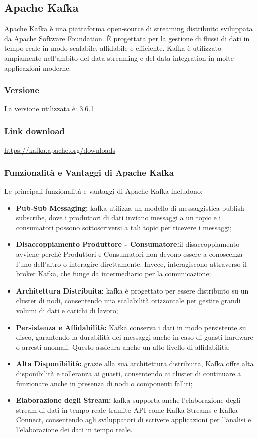 \subsection{Apache Kafka}

Apache Kafka è una piattaforma open-source di streaming distribuito sviluppata da Apache Software Foundation. È progettata per la gestione di flussi di dati in tempo reale in modo scalabile, affidabile e efficiente. Kafka è utilizzato ampiamente nell'ambito del data streaming e del data integration in molte applicazioni moderne.
\subsubsection{Versione}
La versione utilizzata è: 3.6.1
\subsubsection{Link download}
\href{https://kafka.apache.org/downloads}{https://kafka.apache.org/downloads}

\subsubsection{Funzionalità e Vantaggi di Apache Kafka}
Le principali funzionalità e vantaggi di Apache Kafka includono:

\begin{itemize}
  \item \textbf{Pub-Sub Messaging:} kafka utilizza un modello di messaggistica publish-subscribe, dove i produttori di dati inviano messaggi a un topic e i consumatori possono sottoscriversi a tali topic per ricevere i messaggi;
  \item \textbf{Disaccoppiamento Produttore - Consumatore:}il disaccoppiamento avviene perché Produttori e Consumatori non devono essere a conoscenza l'uno dell'altro o interagire direttamente. Invece, interagiscono attraverso il broker Kafka, che funge da intermediario per la comunicazione;
  \item \textbf{Architettura Distribuita:} kafka è progettato per essere distribuito su un cluster di nodi, consentendo una scalabilità orizzontale per gestire grandi volumi di dati e carichi di lavoro;
  
  \item \textbf{Persistenza e Affidabilità:} Kafka conserva i dati in modo persistente su disco, garantendo la durabilità dei messaggi anche in caso di guasti hardware o arresti anomali. Questo assicura anche un alto livello di affidabilità;
  
  \item \textbf{Alta Disponibilità:} grazie alla sua architettura distribuita, Kafka offre alta disponibilità e tolleranza ai guasti, consentendo ai cluster di continuare a funzionare anche in presenza di nodi o componenti falliti;
  
  \item \textbf{Elaborazione degli Stream:} kafka supporta anche l'elaborazione degli stream di dati in tempo reale tramite API come Kafka Streams e Kafka Connect, consentendo agli sviluppatori di scrivere applicazioni per l'analisi e l'elaborazione dei dati in tempo reale.
\end{itemize}


